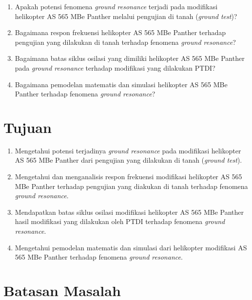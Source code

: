 \begin{enumerate}[nolistsep]
	
	\item Apakah potensi fenomena \textit{ground resonance} terjadi pada modifikasi helikopter AS 565 MBe Panther melalui pengujian di tanah (\textit{ground test})?
	
	\item Bagaimana respon frekuensi helikopter AS 565 MBe Panther terhadap pengujian yang dilakukan di tanah terhadap fenomena \textit{ground resonance}?
	
	\item Bagaimana batas siklus osilasi yang dimiliki helikopter AS 565 MBe Panther pada \textit{ground resonance} terhadap modifikasi yang dilakukan PTDI?
	
	\item Bagaimana pemodelan matematis dan simulasi helikopter AS 565 MBe Panther terhadap fenomena \textit{ground resonance}? 
\end{enumerate}

\section{Tujuan}
\label{sec:Tujuan}

\begin{enumerate}[nolistsep]

	\item Mengetahui potensi terjadinya \textit{ground resonance} pada modifikasi helikopter AS 565 MBe Panther dari pengujian yang dilakukan di tanah (\textit{ground test}).
	
	\item Mengetahui dan menganalisis respon frekuensi modifikasi helikopter AS 565 MBe Panther terhadap pengujian yang diakukan di tanah terhadap fenomena \textit{ground resonance}.
	
	\item Mendapatkan batas siklus osilasi modifikasi helikopter AS 565 MBe Panther hasil modifikasi yang dilakukan oleh PTDI terhadap fenomena \textit{ground resonance}.
	
	\item Mengetahui pemodelan matematis dan simulasi dari helikopter modifikasi AS 565 MBe Panther terhadap fenomena \textit{ground resonance}.
\end{enumerate}

\section{Batasan Masalah}
\label{sec:batasanmasalah}

